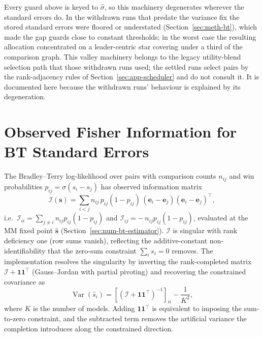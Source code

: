 Every guard above is keyed to $\hat{\sigma}$, so this machinery
degenerates wherever the standard errors do. In the withdrawn runs
that predate the variance fix the stored standard errors were floored
or understated (Section~\ref{sec:meth-bt}), which made the gap guards
close to constant thresholds; in the worst case the resulting
allocation concentrated on a leader-centric star covering under a
third of the comparison graph. This valley machinery belongs to the
legacy utility-blend selection path that those withdrawn runs used;
the settled runs select pairs by the rank-adjacency rules of
Section~\ref{sec:app-scheduler} and do not consult it. It is
documented here because the withdrawn runs' behaviour is explained by
its degeneration.

\section{Observed Fisher Information for BT Standard Errors}\label{sec:num-fisher}

The Bradley--Terry log-likelihood over pairs with comparison counts
$n_{ij}$ and win probabilities
$p_{ij} = \sigma(s_i - s_j)$ has observed information matrix
\[
\mathcal{I}(\mathbf{s})
= \sum_{i < j} n_{ij}\, p_{ij} (1 - p_{ij})\,
(\mathbf{e}_i - \mathbf{e}_j)(\mathbf{e}_i - \mathbf{e}_j)^\top,
\]
i.e.\ $\mathcal{I}_{ii} = \sum_{j \neq i} n_{ij} p_{ij}(1-p_{ij})$
and $\mathcal{I}_{ij} = -\,n_{ij} p_{ij}(1-p_{ij})$, evaluated at the
MM fixed point $\hat{\mathbf{s}}$ (Section~\ref{sec:num-bt-estimator}).
$\mathcal{I}$ is singular with rank deficiency one (row sums vanish),
reflecting the additive-constant non-identifiability that the
zero-sum constraint $\sum_i s_i = 0$ removes.
The implementation resolves the singularity by inverting the
rank-completed matrix $\mathcal{I} + \mathbf{1}\mathbf{1}^\top$
(Gauss--Jordan with partial pivoting) and recovering the
constrained covariance as
\[
\operatorname{Var}(\hat{s}_i)
= \left[(\mathcal{I} + \mathbf{1}\mathbf{1}^\top)^{-1}\right]_{ii}
- \frac{1}{K^{2}},
\]
where $K$ is the number of models. Adding $\mathbf{1}\mathbf{1}^\top$
is equivalent to imposing the sum-to-zero constraint, and the
subtracted term removes the artificial variance the completion
introduces along the constrained direction.

